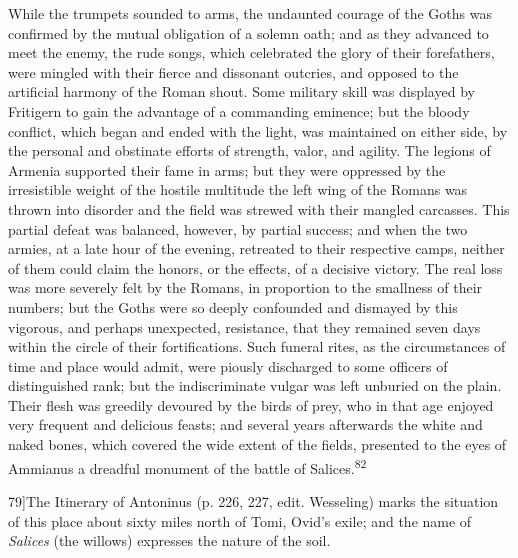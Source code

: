 While the trumpets sounded to arms, the undaunted courage of the
Goths was confirmed by the mutual obligation of a solemn oath;
and as they advanced to meet the enemy, the rude songs, which
celebrated the glory of their forefathers, were mingled with
their fierce and dissonant outcries, and opposed to the
artificial harmony of the Roman shout. Some military skill was
displayed by Fritigern to gain the advantage of a commanding
eminence; but the bloody conflict, which began and ended with the
light, was maintained on either side, by the personal and
obstinate efforts of strength, valor, and agility. The legions of
Armenia supported their fame in arms; but they were oppressed by
the irresistible weight of the hostile multitude the left wing of
the Romans was thrown into disorder and the field was strewed
with their mangled carcasses. This partial defeat was balanced,
however, by partial success; and when the two armies, at a late
hour of the evening, retreated to their respective camps, neither
of them could claim the honors, or the effects, of a decisive
victory. The real loss was more severely felt by the Romans, in
proportion to the smallness of their numbers; but the Goths were
so deeply confounded and dismayed by this vigorous, and perhaps
unexpected, resistance, that they remained seven days within the
circle of their fortifications. Such funeral rites, as the
circumstances of time and place would admit, were piously
discharged to some officers of distinguished rank; but the
indiscriminate vulgar was left unburied on the plain. Their flesh
was greedily devoured by the birds of prey, who in that age
enjoyed very frequent and delicious feasts; and several years
afterwards the white and naked bones, which covered the wide
extent of the fields, presented to the eyes of Ammianus a
dreadful monument of the battle of Salices.\textsuperscript{82}

79]{The Itinerary of Antoninus (p. 226, 227, edit.
Wesseling) marks the situation of this place about sixty miles
north of Tomi, Ovid’s exile; and the name of \textit{Salices} (the
willows) expresses the nature of the soil.}


